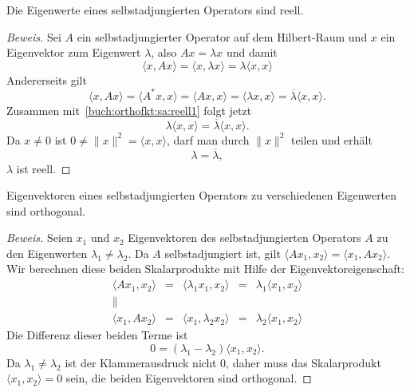 \begin{satz}
Die Eigenwerte eines selbstadjungierten Operators sind reell.
\end{satz}

\begin{proof}[Beweis]
Sei $A$ ein selbstadjungierter Operator auf dem Hilbert-Raum und
$x$ ein Eigenvektor zum Eigenwert $\lambda$, also $Ax=\lambda x$
und damit
\begin{equation}
\langle x,Ax\rangle
=
\langle x,\lambda x\rangle
=
\lambda \langle x,x\rangle
\label{buch:orthofkt:sa:reell1}
\end{equation}
Andererseits gilt
\begin{equation}
\langle x,Ax\rangle
=
\langle A^*x,x\rangle
=
\langle Ax,x\rangle
=
\langle \lambda x,x\rangle
=
\overline{\lambda}
\langle x,x\rangle.
\label{buch:orthofkt:sa:reell2}
\end{equation}
Zusammen mit~\eqref{buch:orthofkt:sa:reell1} folgt jetzt
\[
\lambda \langle x,x\rangle = \overline{\lambda} \langle x,x\rangle.
\]
Da $x\ne 0$ ist $0\ne \|x\|^2 =\langle x,x\rangle$, darf man durch
$\|x\|^2$ teilen und erhält 
\[
\lambda = \overline{\lambda},
\]
$\lambda$ ist reell.
\end{proof}

\begin{satz}
Eigenvektoren eines selbstadjungierten Operators zu verschiedenen Eigenwerten
sind orthogonal.
\end{satz}

\begin{proof}[Beweis]
Seien $x_1$ und $x_2$ Eigenvektoren des selbstadjungierten Operators $A$
zu den Eigenwerten $\lambda_1\ne \lambda_2$.
Da $A$ selbstadjungiert ist, gilt
$\langle Ax_1,x_2\rangle=\langle x_1,Ax_2\rangle$.
Wir berechnen diese beiden Skalarprodukte mit Hilfe der Eigenvektoreigenschaft:
\[
\begin{array}{cclcl}
\langle Ax_1,x_2\rangle
&=&
\langle \lambda_1x_1,x_2\rangle
&=&
\lambda_1 \langle x_1,x_2\rangle
\\
          \|&&&&
\\
\langle x_1,Ax_2\rangle
&=&
\langle x_1,\lambda_2x_2\rangle
&=&
\lambda_2 \langle x_1,x_2\rangle
\end{array}
\]
Die Differenz dieser beiden Terme ist
\[
0
=
(\lambda_1-\lambda_2)\langle x_1,x_2\rangle.
\]
Da $\lambda_1\ne \lambda_2$ ist der Klammerausdruck nicht $0$, daher muss
das Skalarprodukt $\langle x_1,x_2\rangle=0$ sein, die beiden Eigenvektoren
sind orthogonal.
\end{proof}

